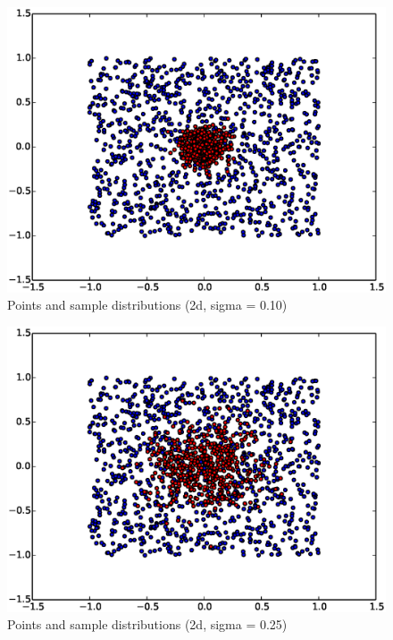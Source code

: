 \documentclass[mcs]{scsthesis}
\begin{document}
\begin{figure}
\begin{center}
\includegraphics[scale=0.5]{diagrams/pts_plot_sigma0.10.eps}
\caption{Points and sample distributions (2d, sigma = 0.10)}
\label{fig:points_and_sample_2d_0_10}
\end{center}
\end{figure}

\begin{figure}
\begin{center}
\includegraphics[scale=0.5]{diagrams/pts_plot_sigma0.25.eps}
\caption{Points and sample distributions (2d, sigma = 0.25)}
\label{fig:points_and_sample_2d_0_25}
\end{center}
\end{figure}
\end{document}
